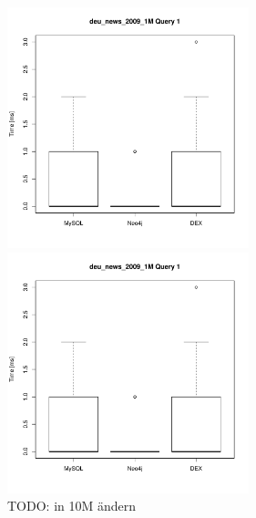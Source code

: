 \documentclass[11pt, a4paper, oneside]{article} %
\begin{document}
\begin{appendix}
\begin{figure}[ht]
\begin{minipage}[hbt]{7cm}
	\centering
	\includegraphics[width=7cm]{../results/cold caches/images/1M_query1_boxplot}
	\caption{...}
	\label{fig:1M_query2_boxplot}
\end{minipage}
\hfill
\begin{minipage}[hbt]{7cm}
	\centering
	\includegraphics[width=7cm]{../results/cold caches/images/1M_query1_boxplot}
	\caption{TODO: in 10M ändern}
	\label{fig:10M_query1_boxplot}
\end{minipage}


\end{figure}
\end{appendix}
\end{document}
